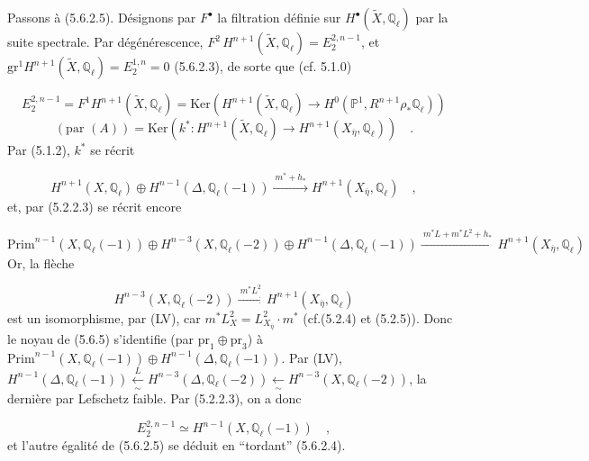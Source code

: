 Passons à (5.6.2.5). Désignons par $F^{\bullet}$ la filtration définie sur $H^{\bullet}(\widetilde{X},\mathbb{Q}_{\ell})$ par la suite spectrale. Par dégénérescence, $F^2\,H^{n+1}(\widetilde{X},\mathbb{Q}_{\ell}) = E_2^{2,n-1}$, et $\mathrm{gr}^1H^{n+1}(\widetilde{X},\mathbb{Q}_{\ell}) = E_2^{1,n} = 0$ (5.6.2.3), de sorte que (cf. 5.1.0)

\begin{equation}\tag{5.6.3}
E_2^{2,n-1} = F^1H^{n+1}(\widetilde{X},\mathbb{Q}_{\ell}) = \mathrm{Ker}(H^{n+1}(\widetilde{X},\mathbb{Q}_{\ell}) \longrightarrow H^0(\mathbb{P}^1,R^{n+1}\rho_*\mathbb{Q}_{\ell}))
\end{equation}
\begin{equation*}
(\text{par }(A)) = \mathrm{Ker}(k^* : H^{n+1}(\widetilde{X},\mathbb{Q}_{\ell}) \longrightarrow H^{n+1}(X_{\overline{\eta}},\mathbb{Q}_{\ell})) \quad .
\end{equation*}
Par (5.1.2), $k^*$ se récrit

\begin{equation}\tag{5.6.4}
H^{n+1}(X,\mathbb{Q}_{\ell}) \oplus H^{n-1}(\Delta,\mathbb{Q}_{\ell}(-1)) \xrightarrow{\ m^*+h_*\ } H^{n+1}(X_{\overline{\eta}},\mathbb{Q}_{\ell}) \quad ,
\end{equation}
et, par (5.2.2.3) se récrit encore

\begin{equation}\tag{5.6.5}
\mathrm{Prim}^{n-1}(X,\mathbb{Q}_{\ell}(-1)) \oplus H^{n-3}(X,\mathbb{Q}_{\ell}(-2)) \oplus H^{n-1}(\Delta,\mathbb{Q}_{\ell}(-1)) \xrightarrow{\ m^*L+m^*L^2+h_*\ } H^{n+1}(X_{\overline{\eta}},\mathbb{Q}_{\ell})
\end{equation}
Or, la flèche

\begin{equation*}
H^{n-3}(X,\mathbb{Q}_{\ell}(-2)) \xrightarrow{\ m^*L^2\ } H^{n+1}(X_{\overline{\eta}},\mathbb{Q}_{\ell})
\end{equation*}
est un isomorphisme, par (LV), car $m^*L_X^2 = L^2_{X_{\overline{\eta}}} \cdot m^*$ (cf.(5.2.4) et (5.2.5)). Donc le noyau de (5.6.5) s'identifie (par $\mathrm{pr}_1 \oplus \mathrm{pr}_3$) à
$\mathrm{Prim}^{n-1}(X,\mathbb{Q}_{\ell}(-1)) \oplus H^{n-1}(\Delta,\mathbb{Q}_{\ell}(-1))$. Par (LV), $H^{n-1}(\Delta,\mathbb{Q}_{\ell}(-1)) \xleftarrow[\sim]{L} H^{n-3}(\Delta,\mathbb{Q}_{\ell}(-2)) \xleftarrow[\sim]{\;} H^{n-3}(X,\mathbb{Q}_{\ell}(-2))$, la dernière par Lefschetz faible. Par (5.2.2.3), on a donc

\begin{equation}\tag{5.6.6}
E_2^{2,n-1} \simeq H^{n-1}(X,\mathbb{Q}_{\ell}(-1)) \quad ,
\end{equation}
et l'autre égalité de (5.6.2.5) se déduit en ``tordant'' (5.6.2.4).

